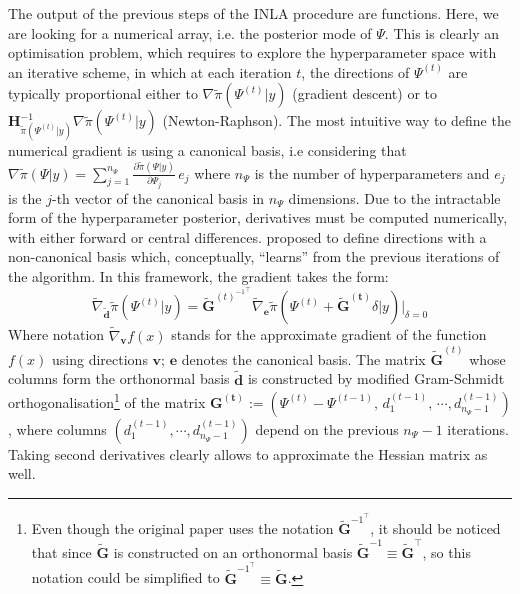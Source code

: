 \documentclass[openany, 11pt, oneside]{book}
\begin{document}
The output of the previous steps of the INLA procedure are functions. Here, we are looking for a numerical array, i.e. the posterior mode of $\Psi$. This is clearly an optimisation problem, which requires to explore the hyperparameter space with an iterative scheme, in which at each iteration $t$, the directions of $\Psi^{(t)}$ are typically proportional either to $\nabla \tilde{\pi}\left(\Psi^{(t)} \vert y \right)$ (gradient descent) or to $\boldsymbol{H}_{\tilde{\pi}(\Psi^{(t)} \vert y)}^{-1}\nabla \tilde{\pi}(\Psi^{(t)} \vert y)$ (Newton-Raphson).
The most intuitive way to define the numerical gradient is using a canonical basis, i.e considering that $\nabla \tilde{\pi}(\Psi\vert y) = \sum_{j=1}^{n_\Psi} \frac{\partial\tilde{\pi}(\Psi\vert y)}{\partial \Psi_j}\, e_j
$ where $n_\Psi$ is the number of hyperparameters and $e_j$ is the $j$-th vector of the canonical basis in $n_\Psi$ dimensions. Due to the intractable form of the hyperparameter posterior, derivatives must be computed numerically, with either forward or central differences. \cite{SmartGrad} proposed to define directions with a non-canonical basis which, conceptually, ``learns'' from the previous iterations of the algorithm. In this framework, the gradient takes the form:
$$
\tilde{\nabla}_{\boldsymbol{\tilde{d}}} \tilde{\pi}\left( \Psi^{(t)}\vert y\right) = \boldsymbol{\tilde{G}}^{{(t)^{-1}}^\top}
\tilde{\nabla}_{\boldsymbol{e}} \tilde{\pi}\left( \Psi^{(t)} + \boldsymbol{\tilde{G}^{(t)}} \delta \vert y\right) \vert_{\delta=0}
$$
Where notation $\tilde{\nabla}_{\boldsymbol{v}}f(x)$ stands for the approximate gradient of the function $f(x)$ using directions $\boldsymbol{v}$; $\boldsymbol{e}$ denotes the canonical basis. The matrix $\boldsymbol{\tilde{G}}^{(t)}$ whose columns form the orthonormal basis $\boldsymbol{\tilde{d}}$ is constructed by modified Gram-Schmidt orthogonalisation\footnote{Even though the original paper uses the notation $\boldsymbol{\tilde{G}}^{{-1}^\top}$, it should be noticed that since $\boldsymbol{\tilde{G}}$ is constructed on an orthonormal basis $\boldsymbol{\tilde{G}}^{-1} \equiv \boldsymbol{\tilde{G}}^\top$, so this notation could be simplified to $\boldsymbol{\tilde{G}}^{{-1}^\top} \equiv \boldsymbol{\tilde{G}}$.} of the matrix $\boldsymbol{G^{(t)}}:=\left( \Psi^{(t)}-\Psi^{(t-1)}, \,  d_1^{(t-1)}, \, \cdots, d_{n_\Psi-1}^{(t-1)} \right)$, where columns $\left( d_1^{(t-1)}, \cdots, d_{n_\Psi-1}^{(t-1)} \right)$ depend on the previous $n_\Psi-1$ iterations. Taking second derivatives clearly allows to approximate the Hessian matrix as well. 
\end{document}
